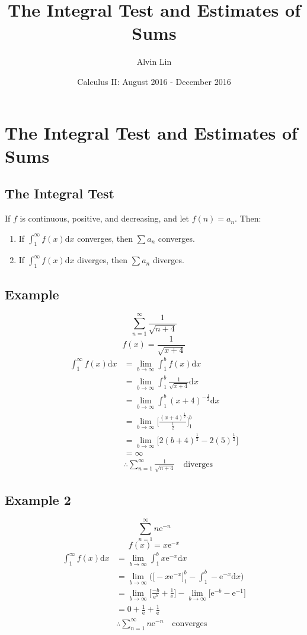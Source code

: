 \documentclass[letterpaper, 12pt]{article}
\title{The Integral Test and Estimates of Sums}
\author{Alvin Lin}
\date{Calculus II: August 2016 - December 2016}
\newcommand*{\diff}{\mathrm{d}}
\newcommand*{\e}{\mathrm{e}}
\begin{document}
\maketitle

\section*{The Integral Test and Estimates of Sums}

\subsection*{The Integral Test}
If \( f \) is continuous, positive, and decreasing, and let \( f(n) = a_{n} \).
Then:
\begin{enumerate}
  \item If \( \int_{1}^{\infty}f(x)\diff{x} \) converges, then
    \( \sum{a_{n}} \) converges.
  \item If \( \int_{1}^{\infty}f(x)\diff{x} \) diverges, then
    \( \sum{a_{n}} \) diverges.
\end{enumerate}

\subsection*{Example}
\[ \sum_{n=1}^{\infty}\frac{1}{\sqrt{n+4}} \]
\[ f(x) = \frac{1}{\sqrt{x+4}} \]
\begin{align*}
  \int_{1}^{\infty}f(x)\diff{x} &=
    \lim_{b\to\infty}\int_{1}^{b}f(x)\diff{x} \\
  &= \lim_{b\to\infty}\int_{1}^{b}\frac{1}{\sqrt{x+4}}\diff{x} \\
  &= \lim_{b\to\infty}\int_{1}^{b}(x+4)^{-\frac{1}{2}}\diff{x} \\
  &= \lim_{b\to\infty}\bigg[
    \frac{(x+4)^{\frac{1}{2}}}{\frac{1}{2}}\bigg]_{1}^{b} \\
  &= \lim_{b\to\infty}\bigg[2(b+4)^{\frac{1}{2}}-2(5)^{\frac{1}{2}}] \\
  &= \infty \\
  & \therefore \sum_{n=1}^{\infty}\frac{1}{\sqrt{n+4}} \quad \mathrm{diverges}
\end{align*}

\subsection*{Example 2}
\[ \sum_{n=1}^{\infty}n\e^{-n} \]
\[ f(x) = x\e^{-x} \]
\begin{align*}
  \int_{1}^{\infty}f(x)\diff{x} &=
    \lim_{b\to\infty}\int_{1}^{b}x\e^{-x}\diff{x} \\
  &= \lim_{b\to\infty}\bigg(\big[-x\e^{-x}\big]_{1}^{b}-
    \int_{1}^{b}-\e^{-x}\diff{x}\bigg) \\
  &= \lim_{b\to\infty}\bigg[\frac{-b}{\e^{b}}+\frac{1}{\e}\bigg]-
    \lim_{b\to\infty}\bigg[\e^{-b}-\e^{-1}\bigg] \\
  &= 0+\frac{1}{\e}+\frac{1}{\e} \\
  & \therefore \sum_{n=1}^{\infty}n\e^{-n} \quad \mathrm{converges}
\end{align*}
\end{document}

